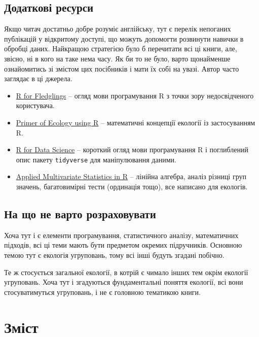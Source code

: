 \documentclass[
  11pt,
]{book}
\begin{document}
\subsection{Додаткові ресурси}\label{resources}

Якщо читач достатньо добре розуміє англійську, тут є перелік непоганих публікацій у відкритому доступі, що можуть допомогти розвинути навички в обробці даних. Найкращою стратегією було б перечитати всі ці книги, але, звісно, ні в кого на таке нема часу. Як би то не було, варто щонайменше ознайомитись зі змістом цих посібників і мати їх собі на увазі. Автор часто заглядає в ці джерела.

\begin{itemize}
\item
  \href{https://www.uvm.edu/~tdonovan/RforFledglings/}{R for Fledglings} -- огляд мови програмування R з точки зору недосвідченого користувача.
\item
  \href{https://hankstevens.github.io/Primer-of-Ecology/index.html}{Primer of Ecology using R} -- математичні концепції екології із застосуванням R.
\item
  \href{https://r4ds.hadley.nz/}{R for Data Science} -- короткий огляд мови програмування R і поглиблений опис пакету \texttt{tidyverse} для маніпулювання даними.
\item
  \href{https://uw.pressbooks.pub/appliedmultivariatestatistics/}{Applied Multivariate Statistics in R} -- лінійна алгебра, аналіз різниці груп значень, багатовимірні тести (ординація тощо), все написано для екологів.
\end{itemize}

\subsection{На що не варто розраховувати}\label{notexpect}

Хоча тут і є елементи програмування, статистичного аналізу, математичних підходів, всі ці теми мають бути предметом окремих підручників. Основною темою тут є екологія угруповань, тому всі інші будуть згадані побічно.

Те ж стосується загальної екології, в котрій є чимало інших тем окрім екології угруповань. Хоча тут і згадуються фундаментальні поняття екології, всі вони стосуватимуться угруповань, і не є головною тематикою книги.

\section{Зміст}\label{ux437ux43cux456ux441ux442}
\end{document}
